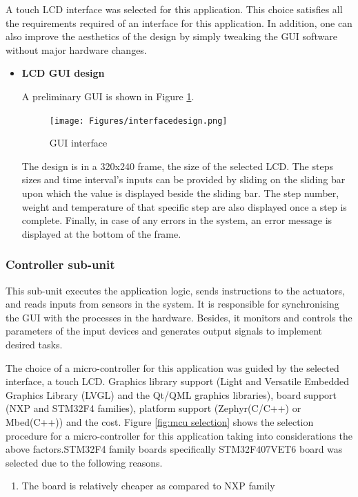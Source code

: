  A touch LCD interface was selected for this application. This choice satisfies all the requirements required of an interface for this application. In addition, one can also improve the aesthetics of the design by simply tweaking the GUI software without major hardware changes.
\begin{itemize}
    \item \textbf{LCD GUI design}
    \par
    A preliminary GUI is shown in Figure \ref{fig:GUI_interface}.
    \begin{figure}[H]
        \centering
        \texttt{[image: Figures/interfacedesign.png]}
        \caption{GUI interface}
        \label{fig:GUI_interface}
    \end{figure}
    The design is in a 320x240 frame, the size of the selected LCD. The steps sizes and time interval's inputs can be provided by sliding on the sliding bar upon which the value is displayed beside the sliding bar. The step number, weight and temperature of that specific step are also displayed once a step is complete. Finally, in case of any errors in the system, an error message is displayed at the bottom of the frame.
\end{itemize}

\subsubsection{Controller sub-unit}
This sub-unit executes the application logic, sends instructions to the actuators, and reads inputs from sensors in the system. It is responsible for synchronising the GUI with the processes in the hardware. Besides, it monitors and controls the parameters of the input devices and generates output signals to implement desired tasks.
\par
The choice of a micro-controller for this application was guided by the selected interface, a touch LCD. Graphics library support (Light and Versatile Embedded Graphics Library (LVGL) and the Qt/QML graphics libraries), board support (NXP and STM32F4 families), platform support (Zephyr(C/C++) or Mbed(C++)) and the cost. Figure \ref{fig:mcu selection} shows the selection procedure for a micro-controller for this application taking into considerations the above factors.STM32F4 family boards specifically STM32F407VET6 board was selected due to the following reasons.
\begin{enumerate}
    \item The board is relatively cheaper as compared to NXP family
\end{enumerate}

